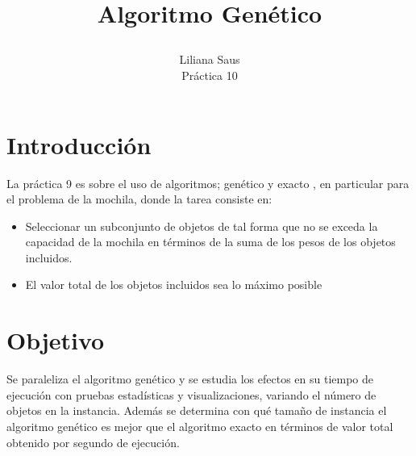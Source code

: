 \documentclass[12pt,letterpaper]{article}
\author{Liliana Saus \\ Práctica 10}
\title{Algoritmo Genético \\   \begin{large}
\end{large}}
\begin{document}
\maketitle

\section*{Introducción}
La práctica 9 es sobre el uso de  algoritmos; genético y exacto , en particular para el problema de la mochila, donde la tarea consiste en:
\begin{itemize}
\item Seleccionar un subconjunto de objetos de tal forma que no se exceda la capacidad de la mochila en términos de la suma de los pesos de los objetos incluidos.
\item El valor total de los objetos incluidos sea lo máximo posible
\end{itemize}
\section*{Objetivo} 
Se paraleliza el algoritmo genético y se estudia los efectos en su tiempo de ejecución con pruebas estadísticas y visualizaciones, variando el número de objetos en la instancia. Además se determina con qué tamaño de instancia el algoritmo genético es mejor que el algoritmo exacto en términos de valor total obtenido por segundo de ejecución.
\end{document}
